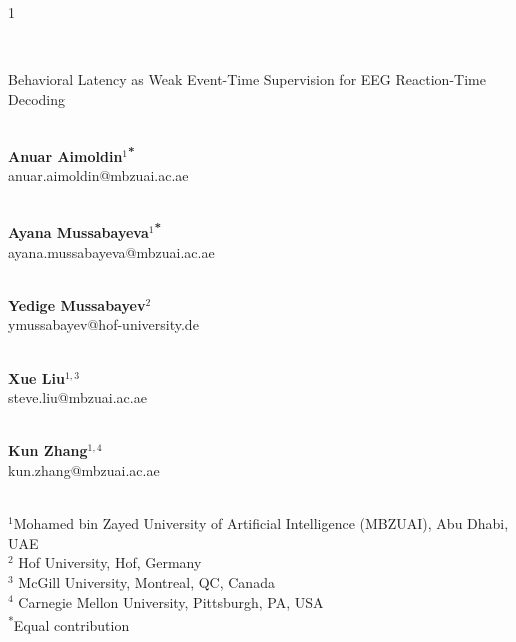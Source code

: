 \documentclass[12pt]{article}
\begin{document}
\hspace{13.9cm}1

\ \vspace{20mm}\\

\begin{center}{\LARGE Behavioral Latency as Weak Event-Time Supervision for EEG Reaction-Time Decoding}
\end{center}

\ \\
{\bf \large Anuar Aimoldin$^{1}$\textsuperscript{*}}\\
anuar.aimoldin@mbzuai.ac.ae

\ \\ {\bf \large Ayana Mussabayeva$^{1}$\textsuperscript{*}}\\
ayana.mussabayeva@mbzuai.ac.ae




\ \\ {\bf \large Yedige Mussabayev$^{\displaystyle 2}$}\\
ymussabayev@hof-university.de

\ \\ {\bf \large Xue Liu$^{\displaystyle 1, 3}$}\\
steve.liu@mbzuai.ac.ae

\ \\ {\bf \large Kun Zhang$^{\displaystyle 1, 4}$}\\
kun.zhang@mbzuai.ac.ae


\ \\
{$^{\displaystyle 1}$Mohamed bin Zayed University of Artificial Intelligence (MBZUAI), Abu Dhabi, UAE}
\ \\
{$^{\displaystyle 2}$ Hof University, Hof, Germany}
\ \\
{$^{\displaystyle 3}$ McGill University, Montreal, QC, Canada}
\ \\
{$^{\displaystyle 4}$ Carnegie Mellon University, Pittsburgh, PA, USA}
\ \\
{\normalsize \textsuperscript{*}Equal contribution}\\
\end{document}
